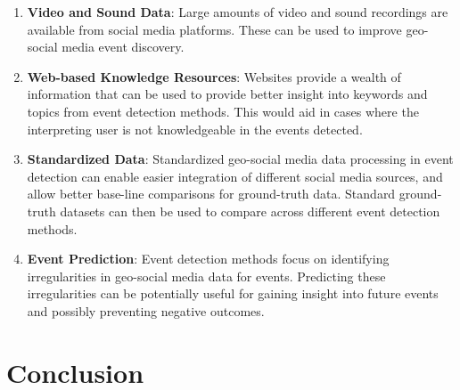 \begin{enumerate}[label=(\alph*)]
  \item \textbf{Video and Sound Data}: Large amounts of video and sound recordings are available from social media platforms. These can be used to improve geo-social media event discovery.
  \item \textbf{Web-based Knowledge Resources}: Websites provide a wealth of information that can be used to provide better insight into keywords and topics from event detection methods. This would aid in cases where the interpreting user is not knowledgeable in the events detected.
  \item \textbf{Standardized Data}: Standardized geo-social media data processing in event detection can enable easier integration of different social media sources, and allow better base-line comparisons for ground-truth data. Standard ground-truth datasets can then be used to compare across different event detection methods.
  \item \textbf{Event Prediction}: Event detection methods focus on identifying irregularities in geo-social media data for events. Predicting these irregularities can be potentially useful for gaining insight into future events and possibly preventing negative outcomes.
\end{enumerate}

\section{Conclusion} \label{conclusion}

